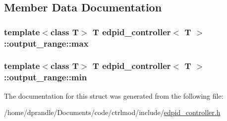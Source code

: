 \subsection{Member Data Documentation}
\hypertarget{structedpid__controller_1_1output__range_aeb1d06ca0965c55a0ecbba04f4d761c6}{
\subsubsection[{max}]{\setlength{\rightskip}{0pt plus 5cm}template$<$class T$>$ T {\bf edpid\-\_\-controller}$<$ T $>$\-::output\-\_\-range\-::max}}\label{structedpid__controller_1_1output__range_aeb1d06ca0965c55a0ecbba04f4d761c6}
\hypertarget{structedpid__controller_1_1output__range_a1d978af84018f7a001c376345ed9db6e}{
\subsubsection[{min}]{\setlength{\rightskip}{0pt plus 5cm}template$<$class T$>$ T {\bf edpid\-\_\-controller}$<$ T $>$\-::output\-\_\-range\-::min}}\label{structedpid__controller_1_1output__range_a1d978af84018f7a001c376345ed9db6e}


The documentation for this struct was generated from the following file\-:\begin{DoxyCompactItemize}
\item 
/home/dprandle/\-Documents/code/ctrlmod/include/\hyperlink{edpid__controller_8h}{edpid\-\_\-controller.\-h}\end{DoxyCompactItemize}
